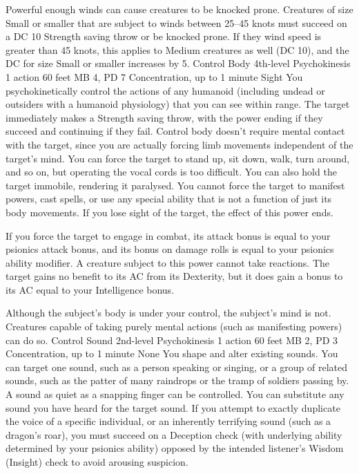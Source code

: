 Powerful enough winds can cause creatures to be knocked prone.
Creatures of size Small or smaller that are subject to winds
between 25--45 knots must succeed on a DC 10 Strength saving
throw or be knocked prone. If they wind speed is greater than
45 knots, this applies to Medium creatures as well (DC 10),
and the DC for size Small or smaller increases by 5.
\DndPowerHeader%
    {Control Body\label{pwr:control-body}}
    {4th-level Psychokinesis}
    {1 action}
    {60 feet}
    {MB 4, PD 7}
    {Concentration, up to 1 minute}
    {Sight}
You psychokinetically control the actions
of any humanoid (including undead or outsiders with a humanoid
physiology) that you can see within range. The target immediately
makes a Strength saving throw, with the power ending if they
succeed and continuing if they fail. Control body doesn't
require mental contact with the target, since you are actually
forcing limb movements independent of the target's mind.
You can force the target to stand up, sit down, walk, turn
around, and so on, but operating the vocal cords is too difficult.
You can also hold the target immobile, rendering it paralysed.
You cannot force the target to manifest powers, cast spells,
or use any special ability that is not a function of just
its body movements. If you lose sight of the target, the effect
of this power ends.

If you force the target to engage in combat, its attack bonus
is equal to your psionics attack bonus, and its bonus on damage
rolls is equal to your psionics ability modifier.
A creature subject to this power cannot take reactions.
The target gains no benefit to its AC from its Dexterity,
but it does gain a bonus to
its AC equal to your Intelligence bonus.

Although the subject's body is under your control, the subject's
mind is not. Creatures capable of taking purely mental actions
(such as manifesting powers) can do so.
\DndPowerHeader%
    {Control Sound\label{pwr:control-sound}}
    {2nd-level Psychokinesis}
    {1 action}
    {60 feet}
    {MB 2, PD 3}
    {Concentration, up to 1 minute}
    {None}
You shape and alter existing sounds. You
can target one sound, such as a person speaking or singing,
or a group of related sounds, such as the patter of many raindrops
or the tramp of soldiers passing by. A sound as quiet as a
snapping finger can be controlled. You can substitute any
sound you have heard for the target sound. If you attempt
to exactly duplicate the voice of a specific individual, or
an inherently terrifying sound (such as a dragon's roar),
you must succeed on a Deception check
(with underlying ability determined by your psionics ability)
opposed by the intended listener's Wisdom (Insight) check
to avoid arousing suspicion.

